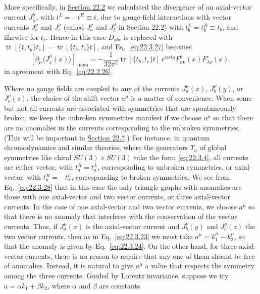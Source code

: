 

More specifically, in \hyperref[sec:22.2]{Section 22.2} we calculated the
divergence of an axial-vector current $J_5^\mu$, with
$t^L=-t^R\equiv t$, due to gauge-field interactions with vector currents
$J_b^\nu$ and $J_c^\rho$ (called $J_a^\nu$ and
$J_b^\rho$ in Section 22.2) with
$t_b^L=t_b^R\equiv t_b$, and likewise for $t_c$. Hence in
this case $D_{abc}$ is replaced with
$\operatorname{tr}[\{t,t_b\}t_c]
=\operatorname{tr}[\{t_b,t_c\}t]$, and Eq.~\eqref{eq:22.3.27}
becomes
\begin{equation}
 \left[
  \partial_\mu\bigl\langle J_5^\mu(x)\bigr\rangle
 \right]_{\mathrm{anom}}
 =-\frac{1}{32\pi^2}
 \operatorname{tr}[\{t_b,t_c\}t]\,
 \epsilon^{\kappa\nu\lambda\rho}
 F_{\kappa\nu}^b(x)F_{\lambda\rho}^c(x),
 \tag{22.3.29}\label{eq:22.3.29}
\end{equation}
in agreement with Eq.~\eqref{eq:22.2.26}.

Where no gauge fields are coupled to any of the currents
$J_a^\mu(x)$, $J_b^\nu(y)$, or $J_c^\rho(z)$, the choice of
the shift vector $a^\mu$ is a matter of convenience. When some but not all
currents are associated with symmetries that are spontaneously broken, we
keep the unbroken symmetries manifest if we choose $a^\mu$ so that there
are no anomalies in the currents corresponding to the unbroken symmetries.
(This will be important in \hyperref[sec:22.7]{Section 22.7}.) For instance,
in quantum chromodynamics and similar theories, where the generators
$T_a$ of global symmetries like chiral $SU(3)\times SU(3)$ take the
form \eqref{eq:22.3.4}, all currents are either vector, with
$t_a^R=t_a^L$, corresponding to unbroken symmetries, or
axial-vector, with $t_a^R=-t_a^L$, corresponding to broken
symmetries. We see from Eq.~\eqref{eq:22.3.28} that in this case the only
triangle graphs with anomalies are those with one axial-vector and two
vector currents, or three axial-vector currents. In the case of one
axial-vector and two vector currents, we choose $a^\mu$ so that there is no
anomaly that interferes with the conservation of the vector currents. Thus,
if $J_a^\mu(x)$ is the axial-vector current and $J_b^\nu(y)$ and
$J_c^\rho(z)$ the two vector currents, then as in
Eq.~\eqref{eq:22.3.23} we must take $a^\mu=k_1^\mu-k_2^\mu$, so that the
anomaly is given by Eq.~\eqref{eq:22.3.24}. On the other hand, for three
axial-vector currents, there is no reason to require that any one of them
should be free of anomalies. Instead, it is natural to give $a^\mu$ a value
that respects the symmetry among the three currents. Guided by Lorentz
invariance, suppose we try $a=\alpha k_1+\beta k_2$, where $\alpha$ and
$\beta$ are constants.

